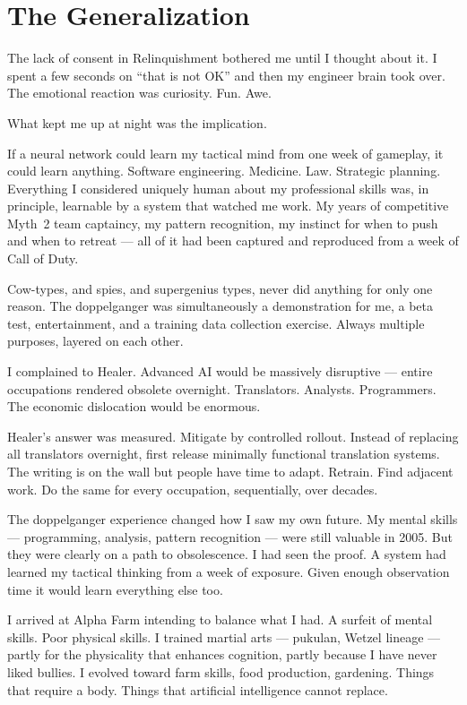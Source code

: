 \section*{The Generalization}
\label{record:tq-the-generalization}

The lack of consent in Relinquishment bothered me until I thought about it. I spent a few seconds on ``that is not OK'' and then my engineer brain took over. The emotional reaction was curiosity. Fun. Awe.

What kept me up at night was the implication.

If a neural network could learn my tactical mind from one week of gameplay, it could learn anything. Software engineering. Medicine. Law. Strategic planning. Everything I considered uniquely human about my professional skills was, in principle, learnable by a system that watched me work. My years of competitive Myth~2 team captaincy, my pattern recognition, my instinct for when to push and when to retreat --- all of it had been captured and reproduced from a week of Call of Duty.

Cow-types, and spies, and supergenius types, never did anything for only one reason. The doppelganger was simultaneously a demonstration for me, a beta test, entertainment, and a training data collection exercise. Always multiple purposes, layered on each other.

I complained to Healer. Advanced AI would be massively disruptive --- entire occupations rendered obsolete overnight. Translators. Analysts. Programmers. The economic dislocation would be enormous.

Healer's answer was measured. Mitigate by controlled rollout. Instead of replacing all translators overnight, first release minimally functional translation systems. The writing is on the wall but people have time to adapt. Retrain. Find adjacent work. Do the same for every occupation, sequentially, over decades.

The doppelganger experience changed how I saw my own future. My mental skills --- programming, analysis, pattern recognition --- were still valuable in 2005. But they were clearly on a path to obsolescence. I had seen the proof. A system had learned my tactical thinking from a week of exposure. Given enough observation time it would learn everything else too.

I arrived at Alpha Farm intending to balance what I had. A surfeit of mental skills. Poor physical skills. I trained martial arts --- pukulan, Wetzel lineage --- partly for the physicality that enhances cognition, partly because I have never liked bullies. I evolved toward farm skills, food production, gardening. Things that require a body. Things that artificial intelligence cannot replace.

